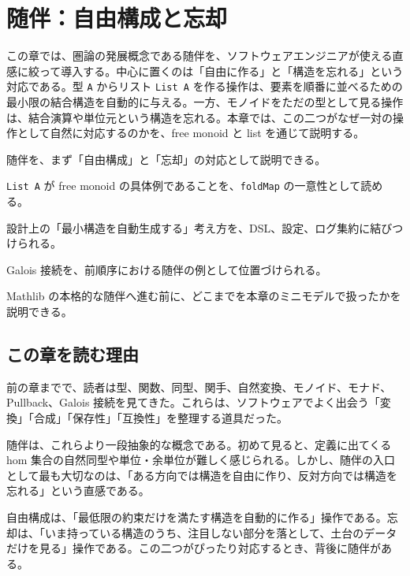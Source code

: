 \chapter{随伴：自由構成と忘却}
\label{chap:ch31_adjunction}

\begin{chapterabstract}
この章では、圏論の発展概念である随伴を、ソフトウェアエンジニアが使える直感に絞って導入する。中心に置くのは「自由に作る」と「構造を忘れる」という対応である。型 \texttt{A} からリスト \texttt{List A} を作る操作は、要素を順番に並べるための最小限の結合構造を自動的に与える。一方、モノイドをただの型として見る操作は、結合演算や単位元という構造を忘れる。本章では、この二つがなぜ一対の操作として自然に対応するのかを、free monoid と list を通じて説明する。
\end{chapterabstract}

\begin{learninggoals}
\item 随伴を、まず「自由構成」と「忘却」の対応として説明できる。
\item \texttt{List A} が free monoid の具体例であることを、\texttt{foldMap} の一意性として読める。
\item 設計上の「最小構造を自動生成する」考え方を、DSL、設定、ログ集約に結びつけられる。
\item Galois 接続を、前順序における随伴の例として位置づけられる。
\item Mathlib の本格的な随伴へ進む前に、どこまでを本章のミニモデルで扱ったかを説明できる。
\end{learninggoals}

\section{この章を読む理由}
\label{sec:ch31-why}

前の章までで、読者は型、関数、同型、関手、自然変換、モノイド、モナド、Pullback、Galois 接続を見てきた。これらは、ソフトウェアでよく出会う「変換」「合成」「保存性」「互換性」を整理する道具だった。

随伴は、これらより一段抽象的な概念である。初めて見ると、定義に出てくる hom 集合の自然同型や単位・余単位が難しく感じられる。しかし、随伴の入口として最も大切なのは、「ある方向では構造を自由に作り、反対方向では構造を忘れる」という直感である。

\begin{intuitionbox}
自由構成は、「最低限の約束だけを満たす構造を自動的に作る」操作である。忘却は、「いま持っている構造のうち、注目しない部分を落として、土台のデータだけを見る」操作である。この二つがぴったり対応するとき、背後に随伴がある。
\end{intuitionbox}

